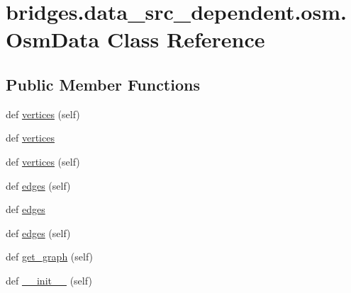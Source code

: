 \hypertarget{classbridges_1_1data__src__dependent_1_1osm_1_1_osm_data}{}\section{bridges.\+data\+\_\+src\+\_\+dependent.\+osm.\+Osm\+Data Class Reference}
\label{classbridges_1_1data__src__dependent_1_1osm_1_1_osm_data}
\subsection*{Public Member Functions}
\begin{DoxyCompactItemize}
\item 
def \mbox{\hyperlink{classbridges_1_1data__src__dependent_1_1osm_1_1_osm_data_a9d254d1ef4043909d4d2bd4427daae39}{vertices}} (self)
\item 
def \mbox{\hyperlink{classbridges_1_1data__src__dependent_1_1osm_1_1_osm_data_aaf96716b8b7e7c5810d8858cb3463a8d}{vertices}}
\item 
def \mbox{\hyperlink{classbridges_1_1data__src__dependent_1_1osm_1_1_osm_data_a9d254d1ef4043909d4d2bd4427daae39}{vertices}} (self)
\item 
def \mbox{\hyperlink{classbridges_1_1data__src__dependent_1_1osm_1_1_osm_data_a1ec1018524a570304e80fb662e266f12}{edges}} (self)
\item 
def \mbox{\hyperlink{classbridges_1_1data__src__dependent_1_1osm_1_1_osm_data_a9a25900d86edcef59c6635ffae2dc5c3}{edges}}
\item 
def \mbox{\hyperlink{classbridges_1_1data__src__dependent_1_1osm_1_1_osm_data_a1ec1018524a570304e80fb662e266f12}{edges}} (self)
\item 
def \mbox{\hyperlink{classbridges_1_1data__src__dependent_1_1osm_1_1_osm_data_a50b43937ae7d87ac21378ed100fce657}{get\+\_\+graph}} (self)
\item 
def \mbox{\hyperlink{classbridges_1_1data__src__dependent_1_1osm_1_1_osm_data_ab36ec2f4933157aed6c28a02b258afee}{\+\_\+\+\_\+init\+\_\+\+\_\+}} (self)
\end{DoxyCompactItemize}
